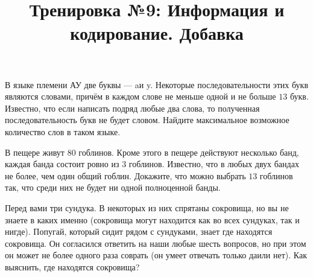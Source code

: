 



\title{Тренировка №9: Информация и кодирование. Добавка}
\maketitle

\begin{problem}
	В языке племени АУ две буквы --- \guillemotleft a\guillemotright и \guillemotleft y\guillemotright. Некоторые последовательности этих букв являются словами, причём в каждом слове не меньше одной и не больше $13$ букв. Известно, что если написать подряд любые два слова, то полученная последовательность букв не будет словом. Найдите максимальное возможное количество слов в таком языке.
\end{problem}

\begin{problem}
	В пещере живут $80$ гоблинов. Кроме этого в пещере действуют несколько банд, каждая банда состоит ровно из $3$ гоблинов. Известно, что в любых двух бандах не более, чем один общий гоблин. Докажите, что можно выбрать $13$ гоблинов так, что среди них не будет ни одной полноценной банды.
\end{problem}

\begin{problem}
	Перед вами три сундука. В некоторых из них спрятаны сокровища, но вы не знаете в каких именно (сокровища могут находится как во всех сундуках, так и нигде). Попугай, который сидит рядом с сундуками, знает где находятся сокровища. Он согласился ответить на наши любые шесть вопросов, но при этом он может не более одного раза соврать (он умеет отвечать только \guillemotleft да\guillemotright или \guillemotleft нет\guillemotright). Как выяснить, где находятся сокровища?
\end{problem}

